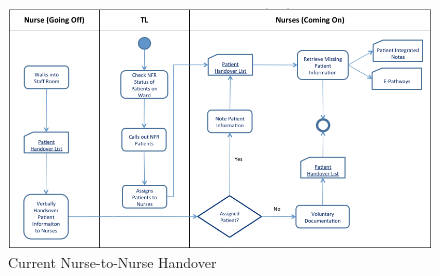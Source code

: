 \begin{figure}[hp]
				\centering
				\includegraphics[angle=-90,scale=1.0, width=120mm]{Images/Nurse-to-Nurse-Handover-Process-As-Is}
				\caption{Current Nurse-to-Nurse Handover}
				\label{Current Nurse-to-Nurse Handover}
\end{figure} 
\newpage

